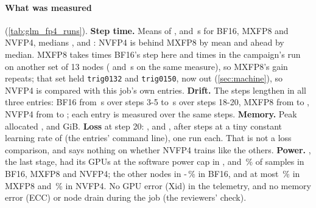 \paragraph{What was measured} (\cref{tab:glm_fp4_runs}). \textbf{Step time.} Means of \TriFpFourStepBf, \TriFpFourStepMx{} and \TriFpFourStepNv\,s for BF16, MXFP8 and NVFP4, medians \TriFpFourMedBf, \TriFpFourMedMx{} and \TriFpFourMedNv: NVFP4 is behind MXFP8 by mean and ahead by median. MXFP8 takes \TriFpFourMxBf{} times BF16's step here and \TriFpFourCampMxBf{} times in the campaign's run on another set of 13 nodes (\TriFpFourCampMx{} and \TriFpFourCampBf\,s on the same measure), so MXFP8's gain repeats; that set held \texttt{trig0132} and \texttt{trig0150}, now out (\cref{sec:machine}), so NVFP4 is compared with this job's own entries. \textbf{Drift.} The steps lengthen in all three entries: BF16 from \TriFpFourStartBf\,s over steps 3-5 to \TriFpFourEndBf\,s over steps 18-20, MXFP8 from \TriFpFourStartMx{} to \TriFpFourEndMx, NVFP4 from \TriFpFourStartNv{} to \TriFpFourEndNv; each entry is measured over the same steps. \textbf{Memory.} Peak allocated \TriFpFourMemBf, \TriFpFourMemMx{} and \TriFpFourMemNv{} GiB. \textbf{Loss} at step 20: \TriFpFourLossBf, \TriFpFourLossMx{} and \TriFpFourLossNv, after \TriFpFourSteps{} steps at a tiny constant learning rate of \TriFpFourLr{} (the entries' command line), one run each. That is not a loss comparison, and says nothing on whether NVFP4 trains like the others. \textbf{Power.} \texttt{\TriFpFourLastHost}, the last stage, had its GPUs at the software power cap in \TriFpFourCapBf, \TriFpFourCapMx{} and \TriFpFourCapNv\,\% of samples in BF16, MXFP8 and NVFP4; the other nodes in \TriFpFourCapOtherBfLo-\TriFpFourCapOtherBfHi\,\% in BF16, and at most \TriFpFourCapOtherMx\,\% in MXFP8 and \TriFpFourCapOtherNv\,\% in NVFP4. No GPU error (Xid) in the telemetry, and no memory error (ECC) or node drain during the job (the reviewers' check).

